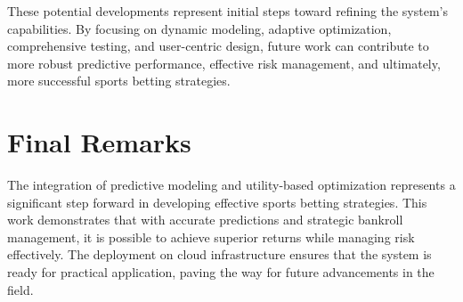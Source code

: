 These potential developments represent initial steps toward refining the system's capabilities. By focusing on dynamic modeling, adaptive optimization, comprehensive testing, and user-centric design, future work can contribute to more robust predictive performance, effective risk management, and ultimately, more successful sports betting strategies.

\section{Final Remarks}

The integration of predictive modeling and utility-based optimization represents a significant step forward in developing effective sports betting strategies. This work demonstrates that with accurate predictions and strategic bankroll management, it is possible to achieve superior returns while managing risk effectively. The deployment on cloud infrastructure ensures that the system is ready for practical application, paving the way for future advancements in the field.






